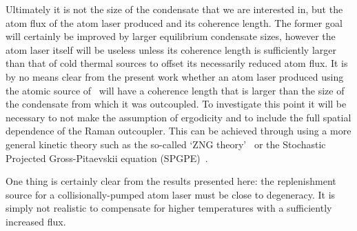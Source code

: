 Ultimately it is not the size of the condensate that we are interested in, but the atom flux of the atom laser produced and its coherence length.  The former goal will certainly be improved by larger equilibrium condensate sizes, however the atom laser itself will be useless unless its coherence length is sufficiently larger than that of cold thermal sources to offset its necessarily reduced atom flux.  It is by no means clear from the present work whether an atom laser produced using the atomic source of~\citet{Muller:2007} will have a coherence length that is larger than the size of the condensate from which it was outcoupled.  To investigate this point it will be necessary to not make the assumption of ergodicity and to include the full spatial dependence of the Raman outcoupler.  This can be achieved through using a more general kinetic theory such as the so-called `ZNG theory'~\citep{Zaremba:1999,Proukakis:2008} or the Stochastic Projected Gross-Pitaevskii equation (SPGPE)~\citep{Blakie:2008a}.

One thing is certainly clear from the results presented here: the replenishment source for a collisionally-pumped atom laser must be close to degeneracy. It is simply not realistic to compensate for higher temperatures with a sufficiently increased flux.



